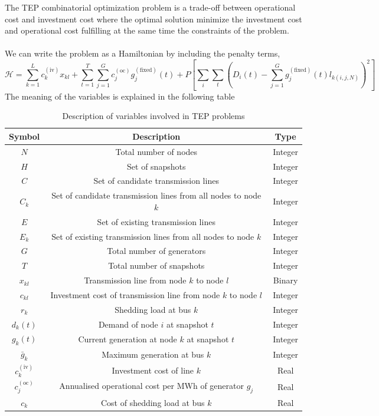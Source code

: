 The TEP combinatorial optimization problem is a trade-off between operational cost and investment cost where the optimal solution minimize the investment cost and operational cost fulfilling at the same time the constraints of the problem.\\\\
We can write the problem as a Hamiltonian by including the penalty terms,
\begin{equation}
    \mathcal{H} = \sum_{k=1}^{L}c_{k}^{(\text{iv})}x_{kl} + \sum_{t=1}^{T}\sum_{j=1}^{G}c_{j}^{(\text{oc})}g_{j}^{(\text{fixed})}(t) + P\left[\sum_{i}\sum_{t}\left(D_{i}(t) - \sum_{j=1}^{G}g_{j}^{(\text{fixed})}(t)l_{k(i,j,N)}\right)^{2}\right]
\end{equation}
The meaning of the variables is explained in the following table
\begin{table}[H]
\centering
\begin{tabular}{|c||c|c|} 
 \hline	
 \textbf{Symbol} & \textbf{Description} & \textbf{Type} \\
 \hline	
 $N$ & Total number of nodes & Integer\\
  \hline	
  $H$ & Set of snapshots & Integer\\
  \hline
 $C$ & Set of candidate transmission lines & Integer\\
    \hline	
 $C_{k}$ & Set of candidate transmission lines from all nodes to node $k$ & Integer\\
  \hline	
 $E$ & Set of existing transmission lines & Integer\\
   \hline	
 $E_{k}$ & Set of existing transmission lines from all nodes to node $k$ & Integer\\
  \hline	
 $G$ & Total number of generators & Integer\\
  \hline	
 $T$ & Total number of snapshots & Integer\\
  \hline	
 $x_{kl}$ & Transmission line from node $k$ to node $l$ & Binary\\
  \hline
  $c_{kl}$ & Investment cost of transmission line from node $k$ to node $l$ & Integer\\
  \hline
  $r_{k}$ & Shedding load at bus $k$ & Integer\\
  \hline	
 $d_{k}(t)$ & Demand of node $i$ at snapshot $t$ & Integer\\
  \hline	
 $g_{k}(t)$ & Current generation at node $k$ at snapshot $t$ & Integer\\
  \hline	
 $\bar{g}_{k}$ & Maximum generation at bus $k$ & Integer\\
  \hline	
 $c_{k}^{(\text{iv})}$ & Investment cost of line $k$ & Real\\
  \hline	
  $c_{j}^{(\text{oc})}$ & Annualised operational cost per MWh of generator $g_{j}$ & Real\\
  \hline
  $c_{k}$ & Cost of shedding load at bus $k$ & Real\\
  \hline
\end{tabular}
\caption{Description of variables involved in TEP problems}
\label{table:TEPNomenclature}
\end{table}
